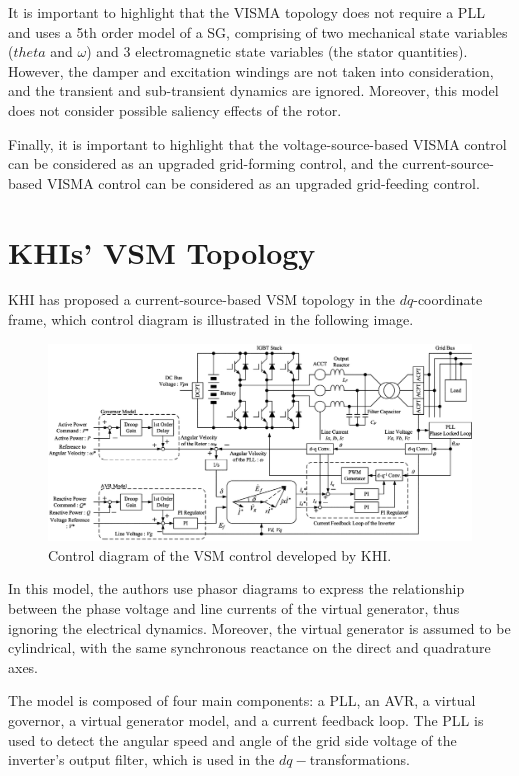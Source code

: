 It is important to highlight that the VISMA topology does not require a PLL and
uses a 5th order model of a SG, comprising of two mechanical state variables
($theta$ and $\omega$) and 3 electromagnetic state variables (the stator
quantities). However, the damper and excitation windings are not taken into
consideration, and the transient and sub-transient dynamics are ignored.
Moreover, this model does not consider possible saliency effects of the rotor.

Finally, it is important to highlight that the voltage-source-based VISMA
control can be considered as an upgraded grid-forming control, and the
current-source-based VISMA control can be considered as an upgraded grid-feeding
control.

\section{KHIs' VSM Topology}\label{sec:KHI}
KHI has proposed a current-source-based VSM topology in the $dq$-coordinate
frame\cite{hirase2013grid}, which control diagram is illustrated in the
following image.

\begin{figure}[ht!]
    \centering
    \includegraphics[width=14cm]{images/KHI.png}
    \caption{Control diagram of the VSM control developed by KHI\cite{hirase2013grid}.}
    \label{fig:KHI}
\end{figure}

In this model, the authors use phasor diagrams to express the relationship
between the phase voltage and line currents of the virtual generator, thus
ignoring the electrical dynamics. Moreover, the virtual generator is assumed to
be cylindrical, with the same synchronous reactance on the direct and quadrature
axes.

The model is composed of four main components: a PLL, an AVR, a virtual
governor, a virtual generator model, and a current feedback loop. The PLL is
used to detect the angular speed and angle of the grid side voltage of the
inverter's output filter, which is used in the $dq-$transformations.

